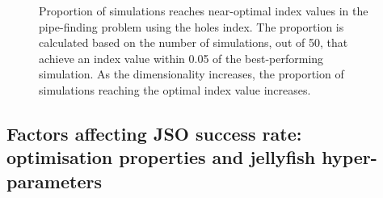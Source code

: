 \documentclass[
  number,
  preprint,
  3p]{elsarticle}
\begin{document}
\begin{figure}


\caption{\label{fig-proportion}Proportion of simulations reaches
near-optimal index values in the pipe-finding problem using the holes
index. The proportion is calculated based on the number of simulations,
out of 50, that achieve an index value within 0.05 of the
best-performing simulation. As the dimensionality increases, the
proportion of simulations reaching the optimal index value increases.}

\end{figure}%

\subsection{Factors affecting JSO success rate: optimisation properties
and jellyfish hyper-parameters}\label{sec-app-2}
\end{document}

